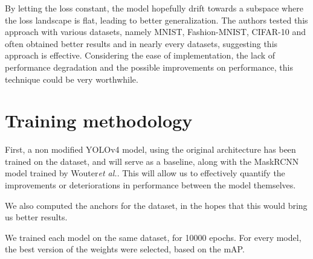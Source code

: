 By letting the loss constant, the model hopefully drift towards a subspace where the loss landscape is flat, leading to better generalization. The authors tested this approach with various datasets, namely MNIST\cite{mnist}, Fashion-MNIST\cite{fashionMNIST}, CIFAR-10\cite{cifar} and often obtained better results and in nearly every datasets, suggesting this approach is effective. Considering the ease of implementation, the lack of performance degradation and the possible improvements on performance, this technique could be very worthwhile.

\section{Training methodology}
First, a non modified YOLOv4 model, using the original architecture has been trained on the dataset, and will serve as a baseline, along with the MaskRCNN model trained by Wouter\textit{et al.}. This will allow us to effectively quantify the improvements or deteriorations in performance between the model themselves. 

We also computed the anchors for the dataset, in the hopes that this would bring us better results. 

We trained each model on the same dataset, for 10000 epochs. For every model, the best version of the weights were selected, based on the mAP.


